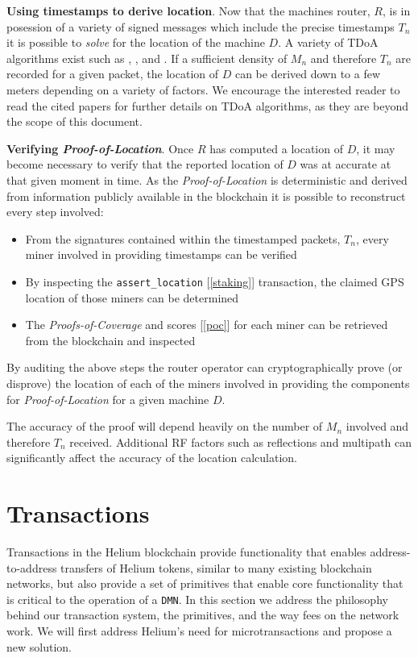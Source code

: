 \documentclass[10pt, nonatbib, nocopyrightspace, reprint]{sigplanconf}
\newcommand{\secref}[1]{[\autoref{#1}]}
\begin{document}
\textbf{Using timestamps to derive location}. Now that the machines router, $R$, is in posession of a variety of signed messages which include the precise timestamps $T_n$ it is possible to \emph{solve} for the location of the machine $D$. A variety of TDoA algorithms exist such as \cite{recurrent-tdoa}, \cite{acoustic-tdoa}, \cite{efficient-tdoa} and \cite{async-tdoa}. If a sufficient density of $M_n$ and therefore $T_n$ are recorded for a given packet, the location of $D$ can be derived down to a few meters depending on a variety of factors. We encourage the interested reader to read the cited papers for further details on TDoA algorithms, as they are beyond the scope of this document.

\textbf{Verifying \emph{Proof-of-Location}}. Once $R$ has computed a location of $D$, it may become necessary to verify that the reported location of $D$ was at accurate at that given moment in time. As the \emph{Proof-of-Location} is deterministic and derived from information publicly available in the blockchain it is possible to reconstruct every step involved:

\begin{itemize}
  \item From the signatures contained within the timestamped packets, $T_n$, every miner involved in providing timestamps can be verified
  \item By inspecting the \verb|assert_location| \secref{staking} transaction, the claimed GPS location of those miners can be determined
  \item The \emph{Proofs-of-Coverage} and scores \secref{poc} for each miner can be retrieved from the blockchain and inspected
\end{itemize}

By auditing the above steps the router operator can cryptographically prove (or disprove) the location of each of the miners involved in providing the components for \emph{Proof-of-Location} for a given machine $D$.

The accuracy of the proof will depend heavily on the number of $M_n$ involved and therefore $T_n$ received. Additional RF factors such as reflections and multipath can significantly affect the accuracy of the location calculation.

\section{Transactions}\label{transactions}

Transactions in the Helium blockchain provide functionality that enables address-to-address transfers of Helium tokens, similar to many existing blockchain networks, but also provide a set of primitives that enable core functionality that is critical to the operation of a \verb|DMN|. In this section we address the philosophy behind our transaction system, the primitives, and the way fees on the network work. We will first address Helium's need for microtransactions and propose a new solution.
\end{document}
